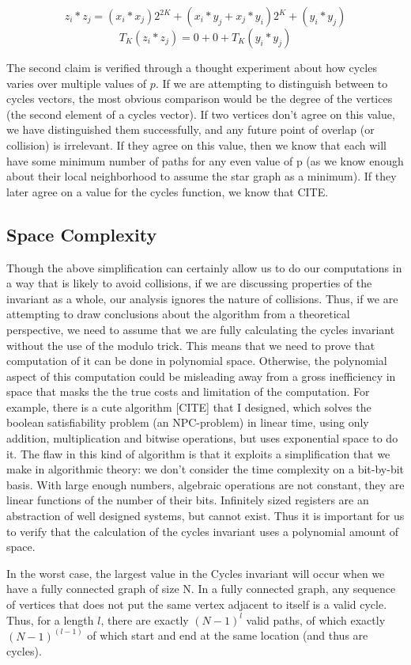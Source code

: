 \documentclass[11pt,a4paper]{report}
\begin{document}
$$z_i * z_j = (x_i*x_j)2^{2K} + (x_i*y_j + x_j*y_i)2^K + (y_i * y_j)$$
$$T_K(z_i * z_j) = 0 + 0 + T_K(y_i * y_j)$$

The second claim is verified through a thought experiment about how cycles varies over multiple values of $p$.
If we are attempting to distinguish between to cycles vectors, the most obvious comparison would be the degree of the vertices (the second element of a cycles vector).
If two vertices don't agree on this value, we have distinguished them successfully, and any future point of overlap (or collision) is irrelevant. 
If they agree on this value, then we know that each will have some minimum number of paths for any even value of p (as we know enough about their local neighborhood to assume the star graph as a minimum). 
If they later agree on a value for the cycles function, we know that CITE.

\subsection{Space Complexity}
Though the above simplification can certainly allow us to do our computations in a way that is likely to avoid collisions, if we are discussing properties of the invariant as a whole, our analysis ignores the nature of collisions.
Thus, if we are attempting to draw conclusions about the algorithm from a theoretical perspective, we need to assume that we are fully calculating the cycles invariant without the use of the modulo trick.
This means that we need to prove that computation of it can be done in polynomial space.
Otherwise, the polynomial aspect of this computation could be misleading away from a gross inefficiency in space that masks the the true costs and limitation of the computation.
For example, there is a cute algorithm [CITE] that I designed, which solves the boolean satisfiability problem (an NPC-problem) in linear time, using only addition, multiplication and bitwise operations, but uses exponential space to do it. 
The flaw in this kind of algorithm is that it exploits a simplification that we make in algorithmic theory: we don't consider the time complexity on a bit-by-bit basis.
With large enough numbers, algebraic operations are not constant, they are linear functions of the number of their bits.
Infinitely sized registers are an abstraction of well designed systems, but cannot exist.
Thus it is important for us to verify that the calculation of the cycles invariant uses a polynomial amount of space.

In the worst case, the largest value in the Cycles invariant will occur when we have a fully connected graph of size N.
In a fully connected graph, any sequence of vertices that does not put the same vertex adjacent to itself is a valid cycle.
Thus, for a length $l$, there are exactly $(N-1)^l$ valid paths, of which exactly $(N-1)^{(l-1)}$ of which start and end at the same location (and thus are cycles).
\end{document}

